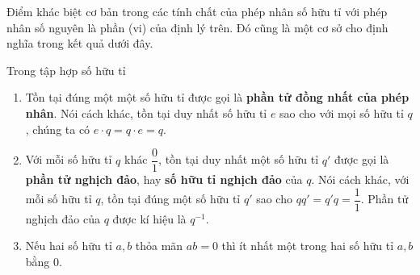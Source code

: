 Điểm khác biệt cơ bản trong các tính chất của phép nhân số hữu tỉ với phép nhân số nguyên là phần (vi) của định lý trên. Đó cũng là một cơ sở cho định nghĩa trong kết quả dưới đây.
\begin{theorem}\label{theorem:rational-numbers-multiplicative-identity-multiplicative-inverse}
    Trong tập hợp số hữu tỉ
    \begin{enumerate}[label={(\roman*)}]
        \item Tồn tại đúng một một số hữu tỉ được gọi là \textbf{phần tử đồng nhất của phép nhân}. Nói cách khác, tồn tại duy nhất số hữu tỉ $e$ sao cho với mọi số hữu tỉ $q$, chúng ta có $e\cdot q = q\cdot e = q$.
        \item Với mỗi số hữu tỉ $q$ khác $\dfrac{0}{1}$, tồn tại duy nhất một số hữu tỉ $q'$ được gọi là \textbf{phần tử nghịch đảo}, hay \textbf{số hữu tỉ nghịch đảo} của $q$. Nói cách khác, với mỗi số hữu tỉ $q$, tồn tại đúng một số hữu tỉ $q'$ sao cho $qq' = q'q = \dfrac{1}{1}$. Phần tử nghịch đảo của $q$ được kí hiệu là $q^{-1}$.
        \item Nếu hai số hữu tỉ $a, b$ thỏa mãn $ab = 0$ thì ít nhất một trong hai số hữu tỉ $a, b$ bằng $0$.
    \end{enumerate}
\end{theorem}

